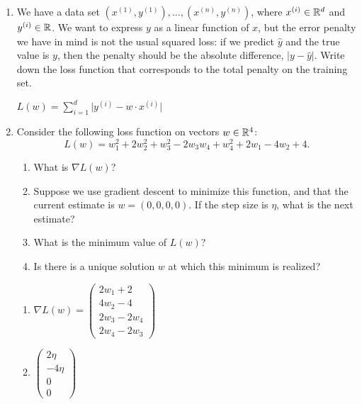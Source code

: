 \documentclass[10pt]{report}
\begin{document}


\begin{enumerate}

\item We have a data set $(x^{(1)}, y^{(1)}), \ldots, (x^{(n)}, y^{(n)})$, where $x^{(i)} \in {\mathbb R}^d$ and $y^{(i)} \in {\mathbb R}$. We want to express $y$ as a linear function of $x$, but the error penalty we have in mind is not the usual squared loss: if we predict $\widehat{y}$ and the true value is $y$, then the penalty should be the absolute difference, $|y - \widehat{y}|$. Write down the loss function that corresponds to the total penalty on the training set.
\begin{solution}

  $L(w) = \sum_{i=1}^{d}{\lvert y^{(i)}-w \cdot x^{(i)} \rvert}$

\end{solution}

\item Consider the following loss function on vectors $w \in {\mathbb R}^4$:
$$ L(w) = w_1^2 + 2 w_2^2 + w_3^2 - 2w_3w_4 + w_4^2 + 2w_1 - 4w_2 + 4 .$$
\begin{enumerate}
\item What is $\nabla L(w)$?
\item Suppose we use gradient descent to minimize this function, and that the current estimate is $w = (0,0,0,0)$. If the step size is $\eta$, what is the next estimate?
\item What is the minimum value of $L(w)$?
\item Is there is a unique solution $w$ at which this minimum is realized?
\end{enumerate}
\begin{solution}
  \begin{enumerate}
    \item 
    $\nabla L(w) = \begin{pmatrix} 
      2w_1 + 2 \\ 
      4w_2 - 4 \\
      2w_3 - 2w_4 \\
      2w_4-2w_3
    \end{pmatrix}$
    \item
    $\begin{pmatrix} 
      2\eta \\ 
      -4\eta \\
      0 \\
      0
    \end{pmatrix}$


\end{enumerate}
\end{solution}
\end{enumerate}
\end{document}
